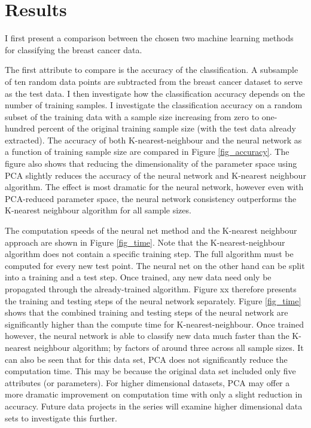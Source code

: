 \documentclass[10pt]{article}
\begin{document}
\section{Results}

I first present a comparison between the chosen two machine learning methods for classifying the breast cancer data. 

The first attribute to compare is the accuracy of the classification. A subsample of ten random data points are subtracted from the breast cancer dataset to serve as the test data. I then investigate how the classification accuracy depends on the number of training samples. I investigate the classification accuracy on a random subset of the training data with a sample size increasing from zero to one-hundred percent of the original training sample size (with the test data already extracted). The accuracy of both K-nearest-neighbour and the neural network as a function of training sample size are compared in Figure \ref{fig_accuracy}. The figure also shows that reducing the dimensionality of the parameter space using PCA slightly reduces the accuracy of the neural network and K-nearest neighbour algorithm. The effect is most dramatic for the neural network, however even with PCA-reduced parameter space, the neural network consistency outperforms the K-nearest neighbour algorithm for all sample sizes. %

The computation speeds of the neural net method and the K-nearest neighbour approach are shown in Figure \ref{fig_time}. Note that the K-nearest-neighbour algorithm does not contain a specific training step. The full algorithm must be computed for every new test point.  The neural net on the other hand can be split into a training and a test step. Once trained, any new data need only be propagated through the already-trained algorithm. Figure xx therefore presents the training and testing steps of the neural network separately. Figure \ref{fig_time} shows that the combined training and testing steps of the neural network are significantly higher than the compute time for K-nearest-neighbour. Once trained however, the neural network is able to classify new data much faster than the K-nearest neighbour algorithm; by factors of around three across all sample sizes. It can also be seen that for this data set, PCA does not significantly reduce the computation time. This may be because the original data set included only five attributes (or parameters). For higher dimensional datasets, PCA may offer a more dramatic improvement on computation time with only a slight reduction in accuracy. Future data projects in the series will examine higher dimensional data sets to investigate this further.
\end{document}
